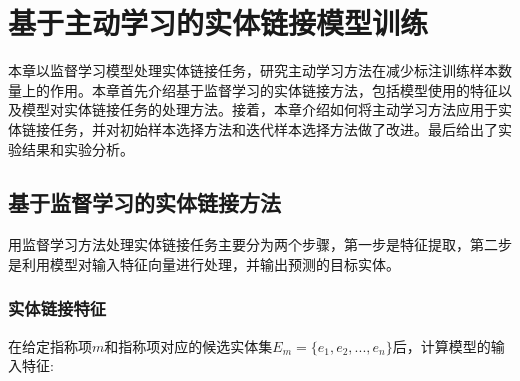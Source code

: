 \chapter{基于主动学习的实体链接模型训练}\label{chapter:al_sup}
本章以监督学习模型处理实体链接任务，研究主动学习方法在减少标注训练样本数量上的作用。本章首先介绍基于监督学习的实体链接方法，包括模型使用的特征以及模型对实体链接任务的处理方法。接着，本章介绍如何将主动学习方法应用于实体链接任务，并对初始样本选择方法和迭代样本选择方法做了改进。最后给出了实验结果和实验分析。

\section{基于监督学习的实体链接方法}
用监督学习方法处理实体链接任务主要分为两个步骤，第一步是特征提取，第二步是利用模型对输入特征向量进行处理，并输出预测的目标实体。
\subsection{实体链接特征}\label{section:superised_feature}
在给定指称项$m$和指称项对应的候选实体集$E_m=\{e_1,e_2,...,e_n\}$后，计算模型的输入特征:

